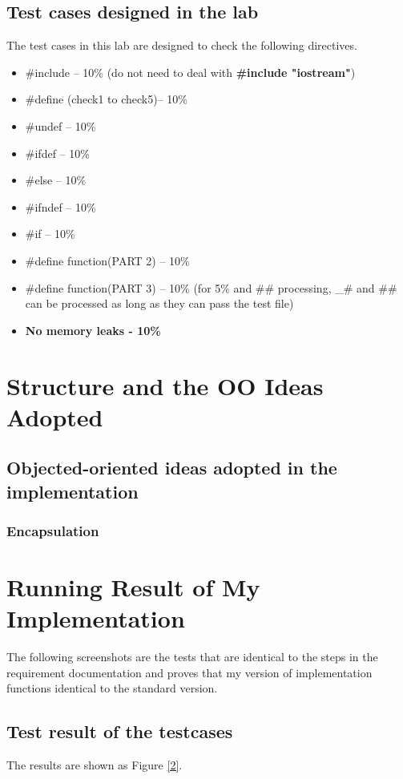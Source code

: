 \documentclass[a4paper]{report}
\begin{document}
\section{Test cases designed in the lab}
The test cases in this lab are designed to check the following directives.
\begin{itemize}
\item \#include – 10\% (do not need to deal with \textbf{\#include "iostream"})
\item \#define (check1 to check5)– 10\%
\item \#undef – 10\%
\item \#ifdef – 10\%
\item \#else – 10\%
\item \#ifndef – 10\%
\item \#if – 10\%
\item \#define function(PART 2) – 10\%
\item \#define function(PART 3) – 10\% (for 5\% and \#\# processing, \_\# and \#\# can be processed as long as they can pass the test file)
\item \textbf{No memory leaks - 10\%}
\end{itemize}

\chapter{Structure and  the OO Ideas Adopted}
\section{Objected-oriented ideas adopted in the implementation}
\subsection{Encapsulation}


\chapter{Running Result of My Implementation}
The following screenshots are the tests that are identical to the steps in the requirement documentation and proves that my version of implementation functions identical to the standard version.
\section{Test result of the testcases}
The results are shown as Figure \ref{2}. 
\end{document}
